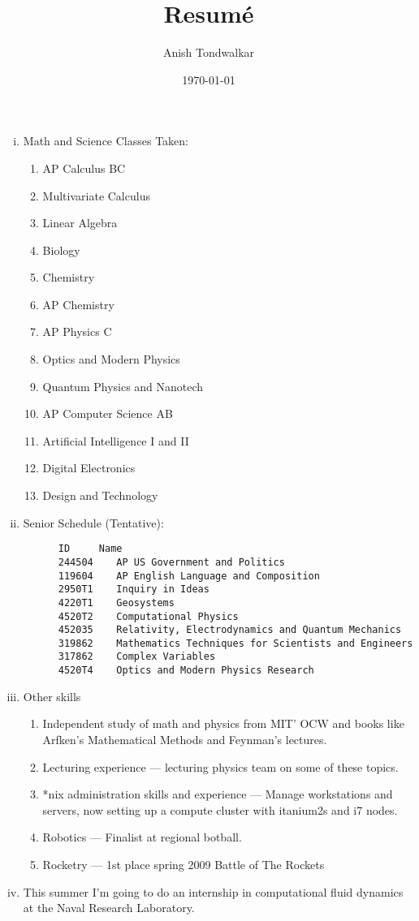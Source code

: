 \documentclass[11pt,notitlepage]{article}
\title{Resum\'e}
\author{Anish Tondwalkar}
\date{\today}
\begin{document}
\maketitle
\begin{enumerate}[i)]
  \item Math and Science Classes Taken: 
    \begin{enumerate}
    \item AP Calculus BC
    \item Multivariate Calculus
    \item Linear Algebra
    \item Biology
    \item Chemistry
    \item AP Chemistry
    \item AP Physics C
    \item Optics and Modern Physics
    \item Quantum Physics and Nanotech
    \item AP Computer Science AB
    \item Artificial Intelligence I and II
    \item Digital Electronics
    \item Design and Technology  
  \end{enumerate}
  \item Senior Schedule (Tentative): 
\begin{verbatim}
      ID     Name	
      244504	AP US Government and Politics
      119604	AP English Language and Composition
      2950T1	Inquiry in Ideas
      4220T1	Geosystems
      4520T2	Computational Physics
      452035	Relativity, Electrodynamics and Quantum Mechanics
      319862	Mathematics Techniques for Scientists and Engineers
      317862	Complex Variables
      4520T4	Optics and Modern Physics Research
\end{verbatim}
  \item Other skills
    \begin{enumerate}
      \item Independent study of math and physics from MIT' OCW and books like Arfken's Mathematical Methods and Feynman's lectures.
      \item Lecturing experience --- lecturing physics team on some of these topics.
      \item *nix administration skills and experience --- Manage workstations and servers, now setting up a compute cluster with itanium2s and i7 nodes.
      \item Robotics --- Finalist at regional botball.
      \item Rocketry --- 1st place spring 2009 Battle of The Rockets
    \end{enumerate}
 \item This summer I'm going to do an internship in computational fluid dynamics at the Naval Research Laboratory. 
\end{enumerate}
\end{document}
